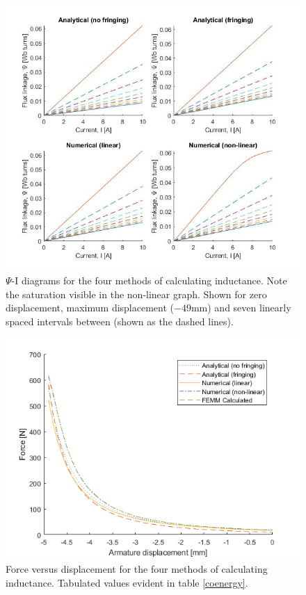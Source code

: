 \documentclass[a4paper]{IEEEtran}
\begin{document}
\begin{figure}[ht]
\includegraphics[width = \linewidth]{psi-I-diagrams.jpg}
\caption{$\Psi$-I diagrams for the four methods of calculating inductance. Note the saturation visible in the non-linear graph. Shown for zero displacement, maximum displacement ($-49$mm) and seven linearly spaced intervals between (shown as the dashed lines).}
\label{psi-eye} 
\end{figure}

\begin{figure}[ht]
\includegraphics[width = \linewidth]{F-x.png}
\caption{Force versus displacement for the four methods of calculating inductance. Tabulated values evident in table \ref{coenergy}.}
\label{forceGraph} 
\end{figure}
\end{document}
